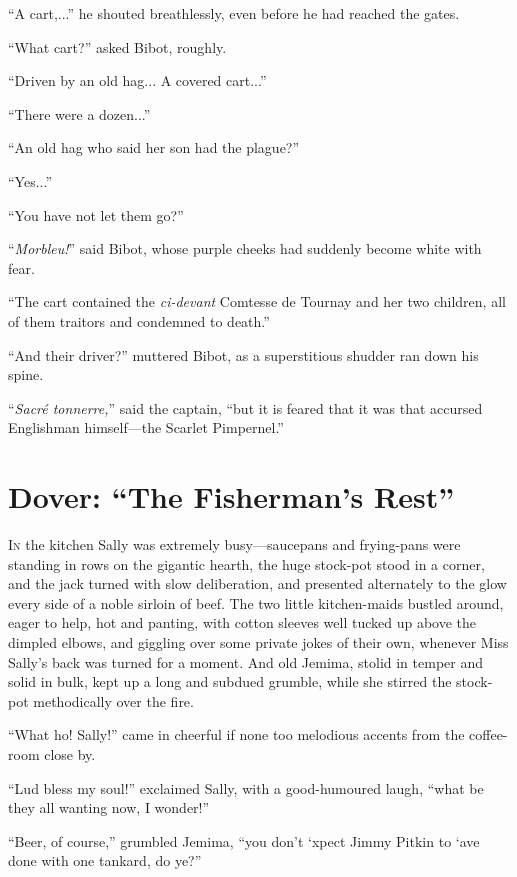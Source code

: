 \documentclass[paper=a5,BCOR=7mm,twoside,DIV=calc,12pt,usegeometry,chapterprefix,endperiod,headings=big]{scrbook}
\begin{document}
\enquote{A cart,...} he shouted breathlessly, even before he had reached the gates.

\enquote{What cart?} asked Bibot, roughly.

\enquote{Driven by an old hag... A covered cart...}

\enquote{There were a dozen...}

\enquote{An old hag who said her son had the plague?}

\enquote{Yes...}

\enquote{You have not let them go?}

\enquote{\textit{Morbleu!}} said Bibot, whose purple cheeks had suddenly become white with fear.

\enquote{The cart contained the \textit{ci-devant} Comtesse de Tournay and her two children, all of them traitors and condemned to death.}

\enquote{And their driver?} muttered Bibot, as a superstitious shudder ran down his spine.

\enquote{\textit{Sacré tonnerre,}} said the captain, \enquote{but it is feared that it was that accursed Englishman himself---the Scarlet Pimpernel.}

\chapter{Dover: \enquote{The Fisherman's Rest}}
\lettrine[lines=4]{I}{n} the kitchen Sally was extremely busy---sauce\-pans and frying-pans were standing in rows on the gigantic hearth, the huge stock-pot stood in a corner, and the jack turned with slow deliberation, and presented alternately to the glow every side of a noble sirloin of beef. The two little kitchen-maids bustled around, eager to help, hot and panting, with cotton sleeves well tucked up above the dimpled elbows, and giggling over some private jokes of their own, whenever Miss Sally's back was turned for a moment. And old Jemima, stolid in temper and solid in bulk, kept up a long and subdued grumble, while she stirred the stock-pot methodically over the fire.

\enquote{What ho! Sally!} came in cheerful if none too melodious accents from the coffee-room close by.

\enquote{Lud bless my soul!} exclaimed Sally, with a good-humoured laugh, \enquote{what be they all wanting now, I wonder!}

\enquote{Beer, of course,} grumbled Jemima, \enquote{you don't `xpect Jimmy Pitkin to `ave done with one tankard, do ye?}
\end{document}
